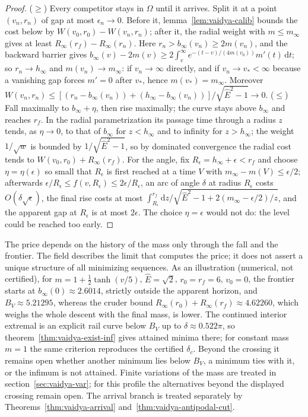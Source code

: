 \documentclass[aip,jmp,amsmath,amssymb,reprint]{revtex4-2}
\newcommand{\Ehat}{\hat E}
\newcommand{\dd}{\mathrm{d}}
\theoremstyle{plain}
\theoremstyle{definition}
\begin{document}
\begin{proof}
($\ge$) Every competitor stays in $\Omega$ until it arrives. Split it at a point $(v_n,r_n)$ of
gap at most $\epsilon_n\to0$. Before it, lemma~\ref{lem:vaidya-calib} bounds the cost below by
$W(v_0,r_0)-W(v_n,r_n)$; after it, the radial weight with $m\le m_\infty$ gives at least
$R_\infty(r_f)-R_\infty(r_n)$. Here $r_n>b_\infty(v_n)\ge2m(v_n)$, and the backward barrier gives
$b_\infty(v)-2m(v)\ge2\int_v^\infty e^{-(t-v)/(4m(v_0))}m'(t)\,\dd t$; so $r_n\to h_\infty$ and
$m(v_n)\to m_\infty$: if $v_n\to\infty$ directly, and if $v_n\to v_*<\infty$ because a vanishing gap
forces $m'=0$ after $v_*$, hence $m(v_*)=m_\infty$. Moreover
$W(v_n,r_n)\le[(r_n-b_\infty(v_n))+(h_\infty-b_\infty(v_n))]/\sqrt{\Ehat^2-1}\to0$.
($\le$) Fall maximally to $b_\infty+\eta$, then rise maximally; the curve stays above $b_\infty$ and
reaches $r_f$. In the radial parametrization its passage time through a radius $z$ tends,
as $\eta\to0$, to that of $b_\infty$ for $z<h_\infty$ and to infinity for $z>h_\infty$; the weight $1/\sqrt w$
is bounded by $1/\sqrt{\Ehat^2-1}$, so by dominated convergence the radial cost tends to
$W(v_0,r_0)+R_\infty(r_f)$. For the angle, fix $R_\epsilon=h_\infty+\epsilon<r_f$ and choose $\eta=\eta(\epsilon)$ so
small that $R_\epsilon$ is first reached at a time $V$ with $m_\infty-m(V)\le\epsilon/2$; afterwards
$\epsilon/R_\epsilon\le f(v,R_\epsilon)\le2\epsilon/R_\epsilon$, an arc of angle $\delta$ at radius $R_\epsilon$ costs
$O(\delta\sqrt\epsilon)$, the final rise costs at most
$\int_{R_\epsilon}^{r_f}\dd z/\sqrt{\Ehat^2-1+2(m_\infty-\epsilon/2)/z}$, and the apparent gap at $R_\epsilon$ is at
most $2\epsilon$. The choice $\eta=\epsilon$ would not do: the level could be reached too early.
\end{proof}

The price depends on the history of the mass only through the fall and the frontier. The
field describes the limit that computes the price; it does not assert a unique structure of
all minimizing sequences. As an illustration (numerical, not certified), for
$m=1+\frac12\tanh(v/5)$, $\Ehat=\sqrt2$, $r_0=r_f=6$, $v_0=0$, the frontier starts at $b_\infty(0)\approx2.6014$,
strictly outside the apparent horizon, and $B_V\approx5.21295$, whereas the cruder bound
$R_\infty(r_0)+R_\infty(r_f)\approx4.62260$, which weighs the whole descent with the final mass, is
lower. The continued interior extremal is an explicit rail curve below $B_V$ up to
$\delta\approx0.522\pi$, so theorem~\ref{thm:vaidya-exist-inf} gives attained minima there; for constant
mass $m=1$ the same criterion reproduces the certified $\delta_c$. Beyond the crossing it remains open
whether another minimum lies below $B_V$, a minimum ties with it, or the infimum is not
attained. Finite variations of the mass are treated in section~\ref{sec:vaidya-var}; for this profile the
alternatives beyond the displayed crossing remain open. The arrival branch is treated
separately by Theorems~\ref{thm:vaidya-arrival} and~\ref{thm:vaidya-antipodal-cut}.
\end{document}
